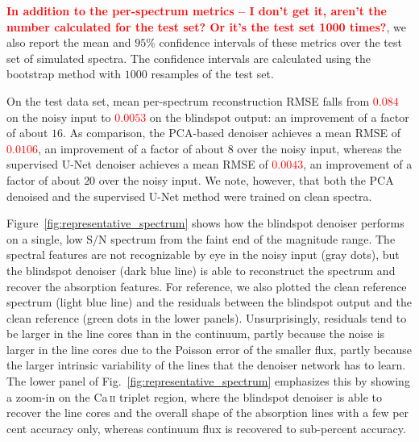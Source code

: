 \documentclass[twocolumn]{aastex7}
\newcommand{\ld}[1]{\textcolor{red}{\textbf{#1}}}
\newcommand{\SNR}{\mathrm{S}/\mathrm{N}}
\begin{document}
\begin{table}
\begin{center}
    
\end{center}
\caption{
    Performance of the various denoising techniques on the test set, measured as the root-mean-squared relative error with respect to the clean reference spectra. The values are reported as the mean, median, $5$-percentile, and $95$-percentile of the per-spectrum RMSE over the $10{,}000$ test spectra. See Fig.~\ref{fig:rmse_hist} for plots of the distributions and the text for discussion.
}
\label{tab:main_baselines}
\end{table}

\ld{In addition to the per-spectrum metrics -- I don't get it, aren't the number calculated for the test set? Or it's the test set 1000 times?}, we also report the mean and $95\%$ confidence intervals of these metrics over the test set of simulated spectra. The confidence intervals are calculated using the bootstrap method with $1000$ resamples of the test set.

On the test data set, mean per-spectrum reconstruction RMSE falls from \ld{$0.084$} on the noisy input to \ld{$0.0053$} on the blindspot output: an improvement of a factor of about $16$. As comparison, the PCA-based denoiser achieves a mean RMSE of \ld{$0.0106$}, an improvement of a factor of about $8$ over the noisy input, whereas the supervised U-Net denoiser achieves a mean RMSE of \ld{$0.0043$}, an improvement of a factor of about $20$ over the noisy input. We note, however, that both the PCA denoised and the supervised U-Net method were trained on clean spectra.

Figure~\ref{fig:representative_spectrum} shows how the blindspot denoiser performs on a single, low $\SNR$ spectrum from the faint end of the magnitude range. The spectral features are not recognizable by eye in the noisy input (gray dots), but the blindspot denoiser (dark blue line) is able to reconstruct the spectrum and recover the absorption features. For reference, we also plotted the clean reference spectrum (light blue line) and the residuals between the blindspot output and the clean reference (green dots in the lower panels). Unsurprisingly, residuals tend to be larger in the line cores than in the continuum, partly because the noise is larger in the line cores due to the Poisson error of the smaller flux, partly because the larger intrinsic variability of the lines that the denoiser network has to learn. The lower panel of Fig.~\ref{fig:representative_spectrum} emphasizes this by showing a zoom-in on the Ca\,\textsc{ii} triplet region, where the blindspot denoiser is able to recover the line cores and the overall shape of the absorption lines with a few per cent accuracy only, whereas continuum flux is recovered to sub-percent accuracy.
\end{document}
